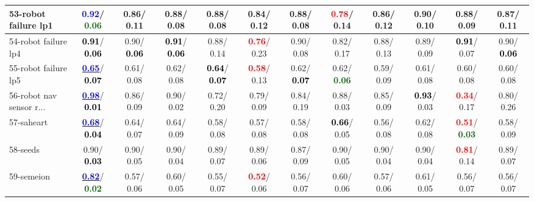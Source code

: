 \begin{table}[h]
\begin{center}
{\begin{tabular}{lc|c|c|c|c|c|c|c|c|c|c}
53-robot failure lp1 & \textcolor{blue}{\textbf{  0.92}}/\textcolor{darkgreen}{\textbf{  0.06}} &   0.86/  0.11 &   0.88/  0.08 &   0.88/  0.08 &   0.84/  0.12 &   0.88/  0.08 & \textcolor{red}{\textbf{  0.78}}/  0.14 &   0.86/  0.12 &   0.90/  0.10 &   0.88/  0.09 &   0.87/  0.11 \\ \hline
54-robot failure lp4 & \textcolor{black}{\textbf{  0.91}}/\textcolor{black}{\textbf{  0.06}} &   0.90/\textcolor{black}{\textbf{  0.06}} & \textcolor{black}{\textbf{  0.91}}/\textcolor{black}{\textbf{  0.06}} &   0.88/  0.14 & \textcolor{red}{\textbf{  0.76}}/  0.23 &   0.90/  0.08 &   0.82/  0.17 &   0.88/  0.13 &   0.89/  0.09 & \textcolor{black}{\textbf{  0.91}}/  0.07 &   0.90/\textcolor{black}{\textbf{  0.06}} \\
55-robot failure lp5 & \underline{\textcolor{blue}{\textbf{  0.65}}}/\textcolor{black}{\textbf{  0.07}} &   0.61/  0.08 &   0.62/  0.08 & \textcolor{black}{\textbf{  0.64}}/\textcolor{black}{\textbf{  0.07}} & \textcolor{red}{\textbf{  0.58}}/  0.13 &   0.62/\textcolor{black}{\textbf{  0.07}} &   0.62/\textcolor{darkgreen}{\textbf{  0.06}} &   0.59/  0.09 &   0.61/  0.08 &   0.60/  0.08 &   0.60/  0.08 \\
56-robot nav sensor r... & \underline{\textcolor{blue}{\textbf{  0.98}}}/\textcolor{black}{\textbf{  0.01}} &   0.86/  0.09 &   0.90/  0.02 &   0.72/  0.20 &   0.79/  0.09 &   0.84/  0.19 &   0.88/  0.03 &   0.85/  0.09 & \textcolor{black}{\textbf{  0.93}}/  0.03 & \textcolor{red}{\textbf{  0.34}}/  0.17 &   0.80/  0.26 \\
57-saheart & \underline{\textcolor{blue}{\textbf{  0.68}}}/\textcolor{black}{\textbf{  0.04}} &   0.64/  0.07 &   0.64/  0.09 &   0.58/  0.08 &   0.57/  0.08 &   0.58/  0.08 & \textcolor{black}{\textbf{  0.66}}/  0.05 &   0.56/  0.08 &   0.62/  0.08 & \textcolor{red}{\textbf{  0.51}}/\textcolor{darkgreen}{\textbf{  0.03}} &   0.58/  0.09 \\
58-seeds &   0.90/\textcolor{black}{\textbf{  0.03}} &   0.90/  0.05 &   0.90/  0.04 &   0.89/  0.07 &   0.89/  0.06 &   0.87/  0.09 &   0.90/  0.05 &   0.90/  0.04 &   0.90/  0.04 & \textcolor{red}{\textbf{  0.81}}/  0.14 &   0.89/  0.07 \\
59-semeion & \underline{\textcolor{blue}{\textbf{  0.82}}}/\textcolor{darkgreen}{\textbf{  0.02}} &   0.57/  0.06 &   0.60/  0.05 &   0.55/  0.07 & \textcolor{red}{\textbf{  0.52}}/  0.06 &   0.56/  0.07 &   0.60/  0.06 &   0.57/  0.06 &   0.61/  0.05 &   0.56/  0.07 &   0.56/  0.07 \\

\end{tabular}}
\end{center}
\end{table}
